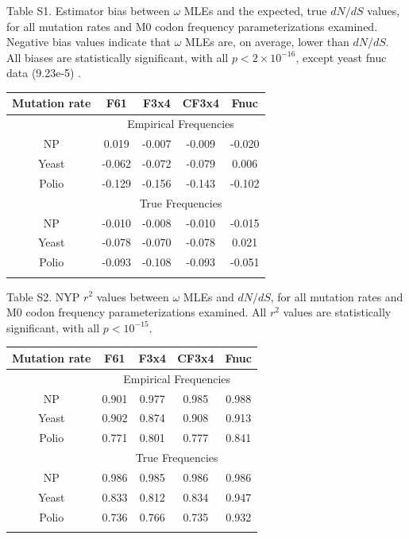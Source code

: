 \documentclass{pnastwo}
\begin{document}
\noindent Table S1. Estimator bias between $\omega$ MLEs and the expected, true $dN/dS$ values, for all mutation rates and M0 codon frequency parameterizations examined. Negative bias values indicate that $\omega$ MLEs are, on average, lower than $dN/dS$. All biases are statistically significant, with all $p < 2 \times 10^{-16}$, except yeast fnuc data (9.23e-5) .
\begin{table}[htbp]
	\begin{tabular}{c c c c c}
		\hline\noalign{\smallskip}
		Mutation rate & F61 & F3x4 & CF3x4 & Fnuc \\
		\hline\noalign{\smallskip}
		& \multicolumn{4}{c}{Empirical Frequencies}\\
		\cline{2-5}\noalign{\medskip}
		NP & 0.019 & -0.007 & -0.009 & -0.020 \\
		Yeast & -0.062 & -0.072 & -0.079 & 0.006 \\
		Polio & -0.129 & -0.156 & -0.143 & -0.102 \\
		\hline\noalign{\smallskip}
		& \multicolumn{4}{c}{True Frequencies}\\
		\cline{2-5}\noalign{\medskip}
		NP & -0.010 & -0.008 & -0.010 & -0.015 \\
		Yeast & -0.078 & -0.070 & -0.078 & 0.021 \\
		Polio & -0.093 & -0.108 & -0.093 & -0.051 \\
		\noalign{\smallskip}\hline\noalign{\smallskip}
	\end{tabular}
\end{table}	

\vspace{2cm}

\noindent Table S2. NYP $r^2$ values between $\omega$ MLEs and $dN/dS$, for all mutation rates and M0 codon frequency parameterizations examined. All $r^2$ values are statistically significant, with all $p < 10^{-15}$.
\begin{table}[htbp]
	\begin{tabular}{c c c c c}
		\hline\noalign{\smallskip}
		Mutation rate & F61 & F3x4 & CF3x4 & Fnuc \\
		\hline\noalign{\smallskip}
		& \multicolumn{4}{c}{Empirical Frequencies}\\
		\cline{2-5}\noalign{\medskip}
		NP & 0.901 & 0.977 & 0.985 & 0.988 \\
		Yeast & 0.902 & 0.874 & 0.908 & 0.913 \\
		Polio & 0.771 & 0.801 & 0.777 & 0.841 \\
		\hline\noalign{\smallskip}
		& \multicolumn{4}{c}{True Frequencies}\\
		\cline{2-5}\noalign{\medskip}
		NP & 0.986 & 0.985 & 0.986 & 0.986 \\
		Yeast & 0.833 & 0.812 & 0.834 & 0.947 \\
		Polio & 0.736 & 0.766 & 0.735 & 0.932 \\
	\noalign{\smallskip}\hline\noalign{\smallskip}
	\end{tabular}
\end{table}	
\end{document}
